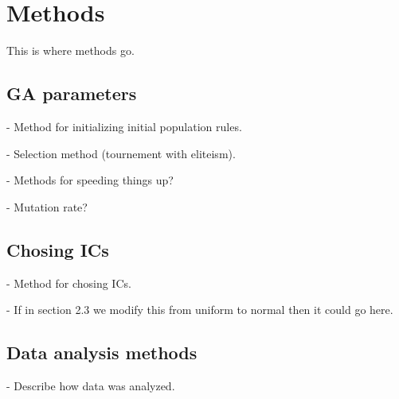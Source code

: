 
\section{Methods}

This is where methods go.

\subsection{GA parameters}

- Method for initializing initial population rules.

- Selection method (tournement with eliteism).

- Methods for speeding things up?

- Mutation rate?

\subsection{Chosing ICs}

- Method for chosing ICs.

- If in section 2.3 we modify this from uniform to normal then it could go here.

\subsection{Data analysis methods}

- Describe how data was analyzed.



